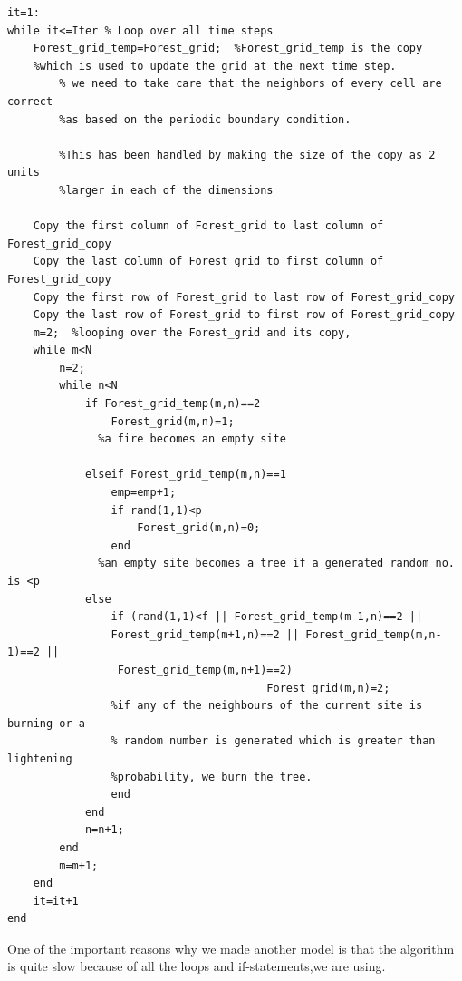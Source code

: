 \documentclass[11pt]{article}
\begin{document}
\begin{verbatim}
it=1:
while it<=Iter % Loop over all time steps
    Forest_grid_temp=Forest_grid;  %Forest_grid_temp is the copy
    %which is used to update the grid at the next time step.
		% we need to take care that the neighbors of every cell are correct 
		%as based on the periodic boundary condition. 

		%This has been handled by making the size of the copy as 2 units 
		%larger in each of the dimensions    
		
    Copy the first column of Forest_grid to last column of Forest_grid_copy
    Copy the last column of Forest_grid to first column of Forest_grid_copy
    Copy the first row of Forest_grid to last row of Forest_grid_copy
    Copy the last row of Forest_grid to first row of Forest_grid_copy
    m=2;  %looping over the Forest_grid and its copy, 
    while m<N
        n=2;
        while n<N
            if Forest_grid_temp(m,n)==2
                Forest_grid(m,n)=1;
              %a fire becomes an empty site  
              
            elseif Forest_grid_temp(m,n)==1
                emp=emp+1;
                if rand(1,1)<p
                    Forest_grid(m,n)=0;
                end
              %an empty site becomes a tree if a generated random no. is <p
            else
                if (rand(1,1)<f || Forest_grid_temp(m-1,n)==2 || 
                Forest_grid_temp(m+1,n)==2 || Forest_grid_temp(m,n-1)==2 ||
                 Forest_grid_temp(m,n+1)==2)
                					    Forest_grid(m,n)=2;
                %if any of the neighbours of the current site is burning or a
                % random number is generated which is greater than lightening 
                %probability, we burn the tree.
                end
            end
            n=n+1;
        end
        m=m+1;
    end
    it=it+1
end
\end{verbatim}
One of the important reasons why we made another model is that the algorithm is quite slow because of all the loops and if-statements,we are using.
\end{document}
